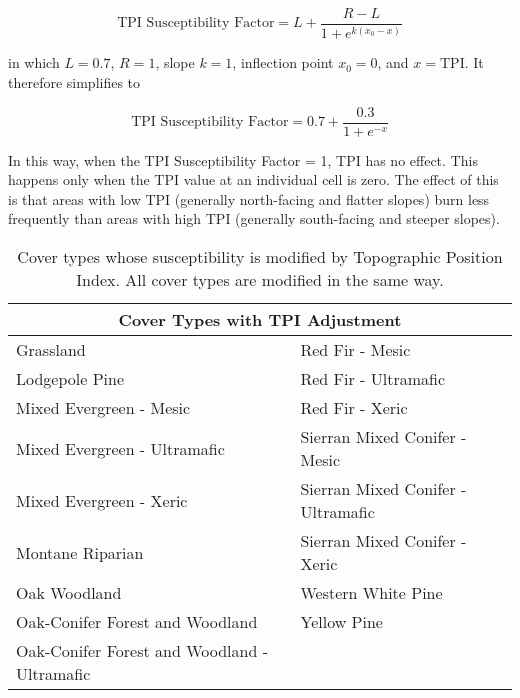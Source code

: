 \begin{itemize}
$$\text{TPI Susceptibility Factor} = L + \frac{R-L}{1+e^{k(x_0-x)}}$$

in which $L= 0.7$, $R=1$, slope $k=1$, inflection point $x_0=0$, and $x=\text{TPI}$.%
It therefore simplifies to 

$$\text{TPI Susceptibility Factor} = 0.7 + \frac{0.3}{1+e^{-x}}$$

In this way, when the TPI Susceptibility Factor = 1, TPI has no effect. This happens only when the TPI value at an individual cell is zero. The effect of this is that areas with low TPI (generally north-facing and flatter slopes) burn less frequently than areas with high TPI (generally south-facing and steeper slopes).


\begin{table}[htbp]
\small
\centering
\caption{Cover types whose susceptibility is modified by Topographic Position Index. All cover types are modified in the same way.}
\label{covtpi}
\begin{tabular}{ll}
\hline
\multicolumn{2}{c}{\textbf{Cover Types with TPI Adjustment}} \\
\hline
Grassland     									& Red Fir - Mesic   					\\
Lodgepole Pine    								& Red Fir - Ultramafic					\\
Mixed Evergreen - Mesic							& Red Fir - Xeric    					\\
Mixed Evergreen - Ultramafic     				& Sierran Mixed Conifer - Mesic    		\\
Mixed Evergreen - Xeric 						& Sierran Mixed Conifer - Ultramafic 	\\
Montane Riparian								& Sierran Mixed Conifer - Xeric 		\\
Oak Woodland 									& Western White Pine					\\
Oak-Conifer Forest and Woodland 				& Yellow Pine 							\\
Oak-Conifer Forest and Woodland - Ultramafic 	&										\\
\hline
\end{tabular}

\end{table}


\end{itemize}
